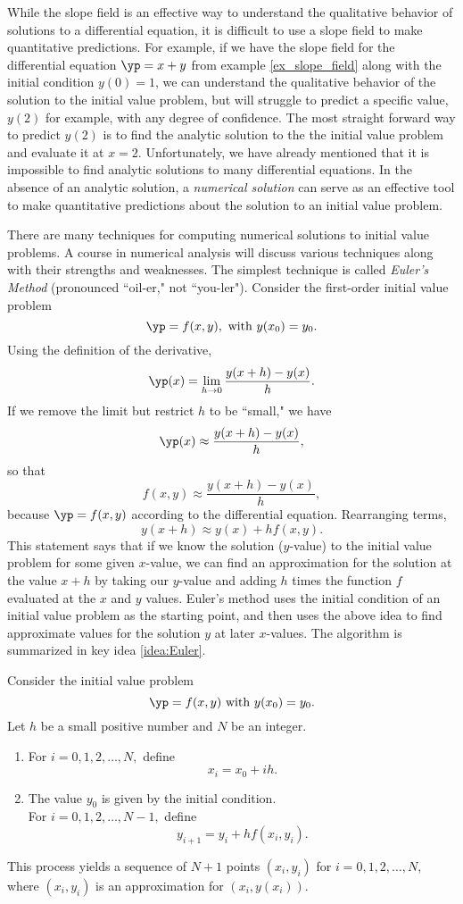While the slope field is an effective way to understand the qualitative behavior of solutions to a differential equation, it is difficult to use a slope field to make quantitative predictions.  For example, if we have the slope field for the differential equation $\yp = x+y$ from example \ref{ex_slope_field} along with the initial condition $y(0)=1$, we can understand the qualitative behavior of the solution to the initial value problem, but will struggle to predict a specific value, $y(2)$ for example, with any degree of confidence. The most straight forward way to predict $y(2)$ is to find the analytic solution to the the initial value problem and evaluate it at $x=2$.  Unfortunately, we have already mentioned that it is impossible to find analytic solutions to many differential equations.  In the absence of an analytic solution, a \emph{numerical solution} can serve as an effective tool to make quantitative predictions about the solution to an initial value problem.

There are many techniques for computing numerical solutions to initial value problems. A course in numerical analysis will discuss various techniques along with their strengths and weaknesses. The simplest technique is called \emph{Euler's Method} (pronounced ``oil-er," not ``you-ler"). Consider the first-order initial value problem
\[\yp = f(x,y), \text{ with } y(x_0) = y_0.\]
Using the definition of the derivative,
\[\yp(x) = \lim_{h \to 0} \frac{y(x+h) - y(x)}{h}.\]
If we remove the limit but restrict $h$ to be ``small," we have
\[\yp(x) \approx \frac{y(x+h) - y(x)}{h},\]
so that
\[f(x,y) \approx \frac{y(x+h)-y(x)}{h},\]
because $\yp = f(x,y)$ according to the differential equation.  Rearranging terms,
\[y(x + h) \approx y(x) + hf(x,y).\]
This statement says that if we know the solution ($y$-value) to the initial value problem for some given $x$-value, we can find an approximation for the solution at the value $x+h$ by taking our  $y$-value and adding $h$ times the function $f$ evaluated at the $x$ and $y$ values. Euler's method uses the initial condition of an initial value problem as the starting point, and then uses the above idea to find approximate values for the solution $y$ at later $x$-values.  The algorithm is summarized in key idea \ref{idea:Euler}.


{Consider the initial value problem 
\[
\yp = f(x,y) \text{ with } y(x_0)=y_0.
\]
Let $h$ be a small positive number and $N$ be an integer.
\begin{enumerate}
\item For $i = 0, 1, 2, \ldots, N,$ define
\[x_i = x_0 + ih.\]
\item  The value $y_0$ is given by the initial condition.\\
For $i = 0, 1, 2, \ldots, N-1,$ define
\[y_{i+1} = y_i + hf(x_i,y_i).\]
\end{enumerate}
This process yields a sequence of $N+1$ points $(x_i,y_i)$ for $i= 0,1,2,\ldots,N$, where $(x_i, y_i)$ is an approximation for $(x_i,y(x_i))$.
}



